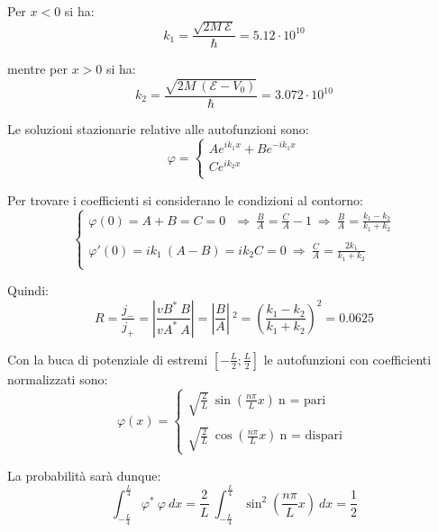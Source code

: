 \documentclass[12pt,twoside,a4]{article}
\begin{document}
\begin{solution}
Per $x < 0$ si ha: \begin{equation*}
 k_1 = \frac{\sqrt{2 M \ \mathcal{E}}}{\hbar} =  5.12 \cdot 10^{10}  
\end{equation*}

mentre per $x > 0$ si ha: \begin{equation*}
k_2 = \frac{\sqrt{2M \ (\mathcal{E} - V_0)}}{\hbar} = 3.072 \cdot 10^{10}    
\end{equation*}

Le soluzioni stazionarie relative alle autofunzioni sono: \begin{equation*}
 \varphi = \begin{cases}
     A e^{ik_1 x} + B e ^{-ik_1 x} \\
      C e^{ik_2 x}\\
 \end{cases}    
\end{equation*}

Per trovare i coefficienti si considerano le condizioni al contorno:\begin{equation*}
\begin{cases} 
\varphi(0) =  A + B = C = 0  \   \   \  \Rightarrow  \  \frac{B}{A} = \frac{C}{A} -1  \  \Rightarrow  \  \frac{B}{A} = \frac{k_1 - k_2}{k_1 + k_2} \\
\\
\varphi'(0) = ik_1 \ (A - B) = i k_2 C = 0  \  \Rightarrow  \  \frac{C}{A} = \frac{2 k_1}{k_1 +k_2} \\
\end{cases} 
\end{equation*}

Quindi: \begin{equation*}
 R = \frac{j_-}{j_+} =\left| \frac{v B^\ast \ B}{v A^\ast \ A} \right|= \left| \frac{B}{A}\right| \ ^2 = \left(\frac{k_1 - k_2}{k_1 + k_2}\right)^2 = 0.0625  
\end{equation*}
\end{solution}

\begin{solution}
Con la buca di potenziale di estremi $\left[- \frac{L}{2} ; \frac{L}{2}\right]$ le autofunzioni con coefficienti normalizzati sono: \begin{equation*}
 \varphi(x) = \begin{cases}
 \sqrt{\frac{2}{L}} \ \sin{\left(\frac{n \pi }{L} x \right)}  \  \text{n = pari } \\
 \\
 \sqrt{\frac{2}{L}} \ \cos{\left(\frac{n \pi }{L} x \right)}  \  \text{n = dispari }
 \end{cases}   
\end{equation*}
 
 \medskip
 La probabilità sarà dunque: 
 \begin{equation*}
 \int_{-\frac{L}{4}}^{\frac{L}{4}} {\varphi^\ast \ \varphi} \ dx = \frac{2}{L} \  \int_{-\frac{L}{4}}^{\frac{L}{4}} {\sin^2{\left(\frac{n \pi}{L} x \right)}} \ dx  = \frac{1}{2}  
 \end{equation*}
 \end{solution}
 
\end{document}
